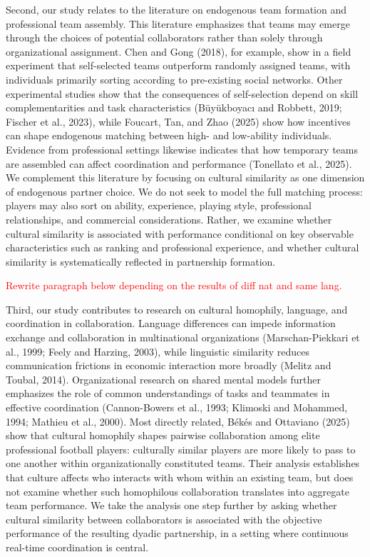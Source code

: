 \documentclass[10pt]{article}
\begin{document}
Second, our study relates to the literature on endogenous team formation and professional team assembly. This literature emphasizes that teams may emerge through the choices of potential collaborators rather than solely through organizational assignment. Chen and Gong (2018), for example, show in a field experiment that self-selected teams outperform randomly assigned teams, with individuals primarily sorting according to pre-existing social networks. Other experimental studies show that the consequences of self-selection depend on skill complementarities and task characteristics (Büyükboyacı and Robbett, 2019; Fischer et al., 2023), while Foucart, Tan, and Zhao (2025) show how incentives can shape endogenous matching between high- and low-ability individuals. Evidence from professional settings likewise indicates that how temporary teams are assembled can affect coordination and performance (Tonellato et al., 2025). We complement this literature by focusing on cultural similarity as one dimension of endogenous partner choice. We do not seek to model the full matching process: players may also sort on ability, experience, playing style, professional relationships, and commercial considerations. Rather, we examine whether cultural similarity is associated with performance conditional on key observable characteristics such as ranking and professional experience, and whether cultural similarity is systematically reflected in partnership formation.

\textcolor{red}{Rewrite paragraph below depending on the results of diff nat and same lang.}

Third, our study contributes to research on cultural homophily, language, and coordination in collaboration. Language differences can impede information exchange and collaboration in multinational organizations (Marschan-Piekkari et al., 1999; Feely and Harzing, 2003), while linguistic similarity reduces communication frictions in economic interaction more broadly (Melitz and Toubal, 2014). Organizational research on shared mental models further emphasizes the role of common understandings of tasks and teammates in effective coordination (Cannon-Bowers et al., 1993; Klimoski and Mohammed, 1994; Mathieu et al., 2000). Most directly related, Békés and Ottaviano (2025) show that cultural homophily shapes pairwise collaboration among elite professional football players: culturally similar players are more likely to pass to one another within organizationally constituted teams. Their analysis establishes that culture affects who interacts with whom within an existing team, but does not examine whether such homophilous collaboration translates into aggregate team performance. We take the analysis one step further by asking whether cultural similarity between collaborators is associated with the objective performance of the resulting dyadic partnership, in a setting where continuous real-time coordination is central.
\end{document}
